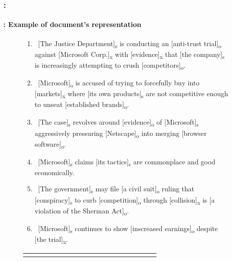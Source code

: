 \documentclass[xcolor=table]{beamer}
\begin{document}
\begin{frame}
	\frametitle{\insertshortsubtitle: \insertsection}
	\framesubtitle{\insertsubsection: Example of document's representation}
	
	\begin{figure}
		\centering
		{\tiny\bfseries
		\begin{minipage}{.8\textwidth}
			\begin{enumerate}
				\item\ [The Justice Department]\textsubscript{s} is conducting an [anti-trust trial]\textsubscript{o} against [Microsoft Corp.]\textsubscript{x} with [evidence]\textsubscript{x} that [the company]\textsubscript{s} is increasingly attempting to crush [competitors]\textsubscript{o}.
				\item\ [Microsoft]\textsubscript{o} is accused of trying to forcefully buy into [markets]\textsubscript{x} where [its own products]\textsubscript{s} are not competitive enough to unseat [established brands]\textsubscript{o}.
				\item\ [The case]\textsubscript{s} revolves around [evidence]\textsubscript{o} of [Microsoft]\textsubscript{s} aggressively pressuring [Netscape]\textsubscript{o} into merging [browser software]\textsubscript{o}.
				\item\ [Microsoft]\textsubscript{s} claims [its tactics]\textsubscript{s} are commonplace and good economically.
				\item\ [The government]\textsubscript{s} may file [a civil suit]\textsubscript{o} ruling that [conspiracy]\textsubscript{s} to curb [competition]\textsubscript{o} through [collision]\textsubscript{x} is [a violation of the Sherman Act]\textsubscript{o}.
				\item\ [Microsoft]\textsubscript{s} continues to show [inscreased earnings]\textsubscript{o} despite [the trial]\textsubscript{x}.
			\end{enumerate}
		\end{minipage}
		
		\color{blue}
		\begin{tabular}{ccccccccccccccccc}
			& \rotatebox[origin=c]{90}{Department} & \rotatebox[origin=c]{90}{Trial} & \rotatebox[origin=c]{90}{Microsoft} &
			\rotatebox[origin=c]{90}{Evidence} & \rotatebox[origin=c]{90}{Competitors} & \rotatebox[origin=c]{90}{Markets} &
			\rotatebox[origin=c]{90}{Products} & \rotatebox[origin=c]{90}{Brands} & \rotatebox[origin=c]{90}{Case} &
			\rotatebox[origin=c]{90}{Netscape} & \rotatebox[origin=c]{90}{Software} & \rotatebox[origin=c]{90}{Tactics} &
			\rotatebox[origin=c]{90}{Government} & \rotatebox[origin=c]{90}{Suit} & \rotatebox[origin=c]{90}{Earnings} & \\
			

\end{tabular}}
\end{figure}
\end{frame}
\end{document}
